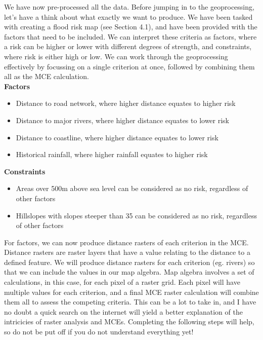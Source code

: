 \documentclass{article}
\begin{document}
We have now pre-processed all the data. Before jumping in to the geoprocessing, let's have a think about what exactly we want to produce. We have been tasked with creating a flood risk map (see Section 4.1), and have been provided with the factors that need to be included. We can interpret these criteria as factors, where a risk can be higher or lower with different degrees of strength, and constraints, where risk is either high or low. We can work through the geoprocessing effectively by focussing on a single criterion at once, followed by combining them all as the MCE calculation. \\

\textbf{Factors}
\begin{itemize}
  \item Distance to road network, where higher distance equates to higher risk
  \item Distance to major rivers, where higher distance equates to lower risk
  \item Distance to coastline, where higher distance equates to lower risk
  \item Historical rainfall, where higher rainfall equates to higher risk
\end{itemize}
\textbf{Constraints}
\begin{itemize}
  \item Areas over 500m above sea level can be considered as no risk, regardless of other factors
  \item Hillslopes with slopes steeper than 35\textdegree{} can be considered as no risk, regardless of other factors \\
\end{itemize}

For factors, we can now produce distance rasters of each criterion in the MCE. Distance rasters are raster layers that have a value relating to the distance to a defined feature. We will produce distance rasters for each criterion (eg. rivers) so that we can include the values in our map algebra. Map algebra involves a set of calculations, in this case, for each pixel of a raster grid. Each pixel will have multiple values for each criterion, and a final MCE raster calculation will combine them all to assess the competing criteria. This can be a lot to take in, and I have no doubt a quick search on the internet will yield a better explanation of the intricicies of raster analysis and MCEs. Completing the following steps will help, so do not be put off if you do not understand everything yet! \\
\end{document}
